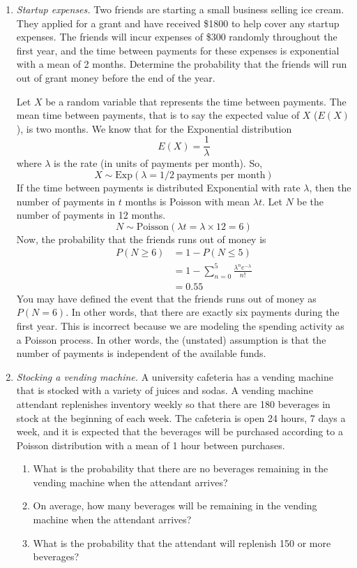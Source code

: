 \begin{enumerate}
\item \emph{Startup expenses.}  Two friends are starting a small
  business selling ice cream. They applied for a grant and have
  received \$\num{1800} to help cover any startup expenses. The
  friends will incur expenses of \$300 randomly throughout the first
  year, and the time between payments for these expenses is
  exponential with a mean of 2 months. Determine the probability that
  the friends will run out of grant money before the end of the year.

\begin{solution}
  \bs Let $X$ be a random variable that represents the time between
  payments. The mean time between payments, that is to say the
  expected value of $X$ ($E(X)$), is two months. We know that for the
  Exponential distribution
  \[ E(X) = \frac{1}{\lambda} \] where $\lambda$ is the rate (in units
  of payments per month). So,
  \[ X \sim \text{Exp}(\lambda = 1/2~\text{payments per month}) \] If
  the time between payments is distributed Exponential with rate
  $\lambda$, then the number of payments in $t$ months is Poisson with
  mean $\lambda t$. Let $N$ be the number of payments in 12 months.
  \[ N \sim \text{Poisson}(\lambda t = \lambda \times 12 = 6) \] Now,
  the probability that the friends runs out of money is
\begin{align*}
      P(N \geq 6) &= 1 - P(N \leq 5) \\
      &= 1 - \sum_{n=0}^{5} \frac{\lambda^n e^{-\lambda}}{n!}\\
      &= 0.55
\end{align*}
You may have defined the event that the friends runs out of
money as $P(N = 6)$. In other words, that there are exactly
six payments during the first year.  This is incorrect because
we are modeling the spending activity as a Poisson process. In
other words, the (unstated) assumption is that the number of
payments is independent of the available funds.
\end{solution}

\item \emph{Stocking a vending machine.}  A university cafeteria has a
  vending machine that is stocked with a variety of juices and
  sodas. A vending machine attendant replenishes inventory weekly so
  that there are 180 beverages in stock at the beginning of each
  week. The cafeteria is open 24 hours, 7 days a week, and it is
  expected that the beverages will be purchased according to a Poisson
  distribution with a mean of 1 hour between purchases.
\begin{enumerate}
\item What is the probability that there are no beverages remaining in
  the vending machine when the attendant arrives? \label{ex:pout}
\item On average, how many beverages will be remaining in the vending
  machine when the attendant arrives? \label{ex:qremain}
\item What is the probability that the attendant will replenish 150 or
  more beverages? \label{ex:preplenish}
\end{enumerate}


\end{enumerate}
